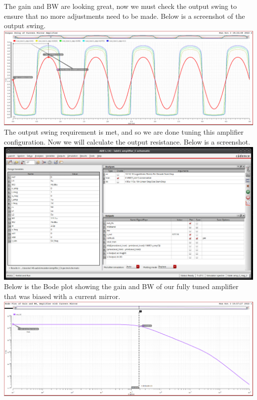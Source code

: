 \documentclass[12pt, fleqn]{article}
\begin{document}
The gain and BW are looking great, now we must check the output swing to ensure that no more adjustments need to be made.  Below is a screenshot of the output swing.\\[0.1cm]
\includegraphics[scale=0.25, center]{d_swing.png}
\newpage\noindent
The output swing requirement is met, and so we are done tuning this amplifier configuration.  Now we will calculate the output resistance.  Below is a screenshot.\\[0.1cm]
\includegraphics[scale=0.35, center]{d_output_res.png}\\[0.25cm]
Below is the Bode plot showing the gain and BW of our fully tuned amplifier that was biased with a current mirror.\\[0.1cm]
\includegraphics[scale=0.25, center]{d_bode.png}
\newpage
\end{document}
